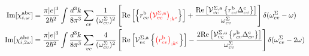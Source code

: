 \documentclass{article}
\begin{document}
\begin{equation*}\label{eq:chis}
\begin{split}
\mathrm{Im}[\chi^{\mathrm{a}\mathrm{b}\mathrm{c}}_{i,\omega}]&= 
\frac{\pi\vert e\vert^3}{2\hbar^2}
\int \frac{d^{3}k}{8\pi^3}
\sum_{cv}\frac{1}{(\omega^\Sigma_{cv})^{2}}
\left[
\mathrm{Re}\left[\left\{r^{\mathrm{b}}_{cv}
\textcolor{red}{\left(\mathcal{V}^{\Sigma,\mathrm{a}}_{vc}\right)_{;k^{\mathrm{c}}}}\right\}
\right]
+\frac{\mathrm{Re}\left[\mathcal{V}^{\Sigma,\mathrm{a}}_{vc}
\left\{r^{\mathrm{b}}_{cv}\Delta^{\mathrm{c}}_{cv}\right\}
\right]}{\omega^\Sigma_{cv}} 
\right]\delta(\omega^\Sigma_{cv}-\omega)\\
\mathrm{Im}[\chi^{\mathrm{a}\mathrm{b}\mathrm{c}}_{i,2\omega}]&= 
 \frac{\pi \vert
   e\vert^{3}}{2\hbar^2}
\int \frac{d^{3}k}{8\pi^3}
\sum_{vc}\frac{4}{(\omega^\Sigma_{cv})^{2}}
\left[\mathrm{Re}\left[\mathcal{V}^{\Sigma,\mathrm{a}}_{vc}
\left\{\textcolor{red}{\left(r^{\mathrm{b}}_{cv}\right)_{;k^{\mathrm{c}}}}
\right\}\right] -
\frac{2\mathrm{Re}\left[\mathcal{V}^{\Sigma,\mathrm{a}}_{vc}
\left\{r^{\mathrm{b}}_{cv}\Delta^{\mathrm{c}}_{cv}\right\}\right]}
{\omega^\Sigma_{cv}}\right]\delta(\omega^\Sigma_{cv}-2\omega)
\end{split}
\end{equation*}
\end{document}

